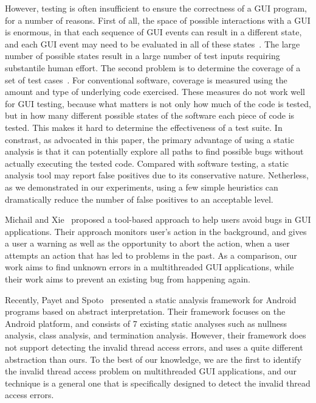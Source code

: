 However, testing is often insufficient to ensure the correctness of a GUI program, for
a number of reasons. First of all, the space of possible interactions
with a GUI is enormous, in that each sequence of GUI
events can result in a different state, and each GUI event
may need to be evaluated in all of these states~\cite{YuanMemonICSE2007}.
The large number of possible states result in a large number of
test inputs requiring substantile human effort. The second
problem is to determine the coverage of a set of test
cases~\cite{MemonFSE2001}. For conventional software, coverage is measured
using the amount and type of underlying code exercised.
These measures do not work well for GUI testing, because
what matters is not only how much of the code is tested,
but in how many different possible states of the software
each piece of code is tested. This makes it hard to determine
the effectiveness of a test suite. %
In constrast, as advocated in this paper, the primary advantage of
using a static analysis is that it can potentially explore
all paths to find possible bugs without actually executing the tested code. %
Compared with software testing, a static analysis tool may
report false positives due to its conservative nature. Netherless,
as we demonstrated in our experiments, using a few simple heuristics
can dramatically reduce the number of false positives  to
an acceptable level.


Michail and Xie~\cite{michail05:helping} proposed a tool-based approach to help users avoid bugs
in GUI applications. Their approach monitors user's action in the background,
and gives a user a warning as well as the opportunity to abort the action, when
a user attempts an action that has led to problems in the past. 
As a comparison, our work aims to find unknown errors in a multithreaded
GUI applications, while their work aims to prevent an existing bug
from happening again.


Recently, Payet and Spoto~\cite{Payet:2011:SAA:2032266.2032299} presented a static
analysis framework for Android programs based on  abstract
interpretation. Their framework focuses on the Android platform, and
 consists of 7 existing static analyses such as
nullness analysis, class analysis, and termination analysis.  However,
their framework does not support detecting the invalid thread access
errors, and uses a quite different abstraction than ours.
To the best of our knowledge, we are the first to identify the invalid
thread access problem on multithreaded GUI applications, and
our technique is a general one that is specifically designed to detect
the invalid thread access errors.

